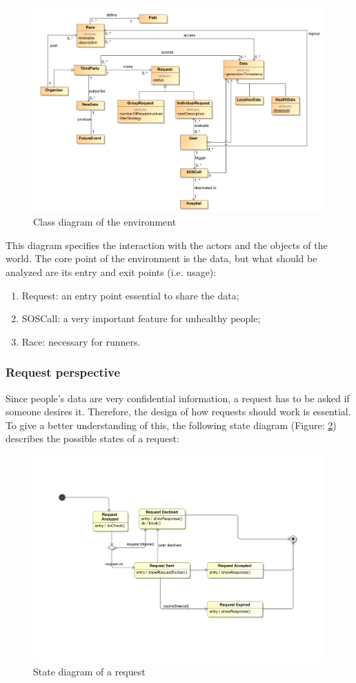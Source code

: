 \begin{figure}[H]
\includegraphics[width=\linewidth]{Images/classdiagram}
\caption{Class diagram of the environment}
\label{fig:classdiagram}
\end{figure}

This diagram specifies the interaction with the actors and the objects of the world. The core point of 
the environment is the data, but what should be analyzed are its entry and exit points (i.e. usage):

\begin{enumerate}
\item Request: an entry point essential to share the data;
\item SOSCall: a very important feature for unhealthy people;
\item Race: necessary for runners.
\end{enumerate}

\subsubsection{Request perspective}
Since people's data are very confidential information, a request has to be asked if someone desires it. 
Therefore, the design of how requests should work is essential. To give a better understanding of this, 
the following state diagram (Figure: \ref{fig:requestdiagram})  describes the possible states of a request:

\begin{figure}[H]
\includegraphics[width=0.8\linewidth]{Images/requestdiagram}
\caption{State diagram of a request}
\label{fig:requestdiagram}
\end{figure}

